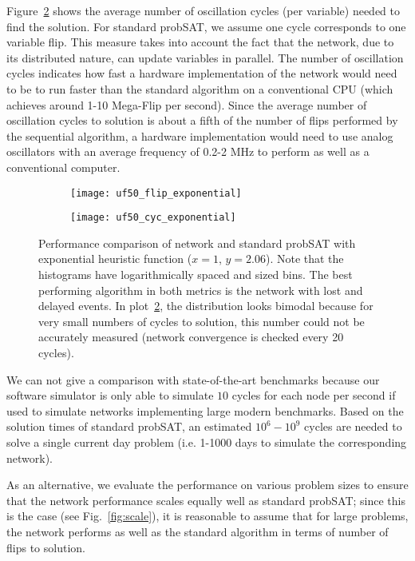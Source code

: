 \documentclass[10pt]{article}
\begin{document}
Figure~\ref{fig:net_noErr_exp_cyc} shows the average number of oscillation cycles (per variable) needed to find the solution. For standard probSAT, we assume one cycle corresponds to one variable flip. This measure takes into account the fact that the network, due to its distributed nature, can update variables in parallel. The number of oscillation cycles indicates how fast a hardware implementation of the network would need to be to run faster than the standard algorithm on a conventional CPU (which achieves around 1-10 Mega-Flip per second). Since the average number of oscillation cycles to solution is about a fifth of the number of flips performed by the sequential algorithm, a hardware implementation would need to use analog oscillators with an average frequency of 0.2-2 MHz to perform as well as a conventional computer. 

\begin{figure}
 \centering
     \begin{subfigure}[h]{0.4\textwidth}
     \texttt{[image: uf50\_flip\_exponential]} 
     \label{fig:net_noErr_exp_flip}
   \end{subfigure}
   \quad
   \begin{subfigure}[h]{0.4\textwidth}
     \texttt{[image: uf50\_cyc\_exponential]} 
     \label{fig:net_noErr_exp_cyc}
   \end{subfigure}
   \caption{Performance comparison of network and standard probSAT with exponential heuristic function ($x=1$, $y=2.06$). Note that the histograms have logarithmically spaced and sized bins. The best performing algorithm in both metrics is the network with lost and delayed events. In plot~\ref{fig:net_noErr_exp_cyc}, the distribution looks bimodal because for very small numbers of cycles to solution, this number could not be accurately measured (network convergence is checked every 20 cycles).}
\label{fig:net_noErr}
\end{figure}	

We can not give a comparison with state-of-the-art benchmarks because our software simulator is only able to simulate $10$ cycles for each node per second if used to simulate networks implementing large modern benchmarks. Based on the solution times of standard probSAT, an estimated $10^6-10^9$ cycles are needed to solve a single current day problem (i.e. 1-1000 days to simulate the corresponding network).

As an alternative, we evaluate the performance on various problem sizes to ensure that the network performance scales equally well as standard probSAT; since this is the case (see Fig.~\ref{fig:scale}), it is reasonable to assume that for large problems, the network performs as well as the standard algorithm in terms of number of flips to solution. 
\end{document}
